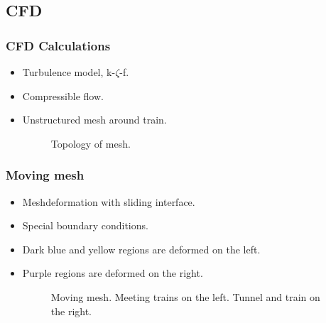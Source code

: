 \documentclass{beamer}
\begin{document}
\subsection{CFD}
\begin{frame}
 \frametitle{CFD Calculations}
 \begin{itemize}
  \item Turbulence model, k-$\zeta$-f.
  \item Compressible flow.
  \item Unstructured mesh around train.
    \begin{figure}
	\centering
	\caption{Topology of mesh.}
  \end{figure}
 \end{itemize}
\end{frame}

\begin{frame}
 \frametitle{Moving mesh}
 \begin{itemize}
  \item Meshdeformation with sliding interface.
  \item Special boundary conditions.
  \item Dark blue and yellow regions are deformed on the left.
  \item Purple regions are deformed on the right.
  \begin{figure}
	\centering
	\caption{Moving mesh. Meeting trains on the left. Tunnel and train on the right.}
  \end{figure}
 \end{itemize}
\end{frame}
\end{document}
